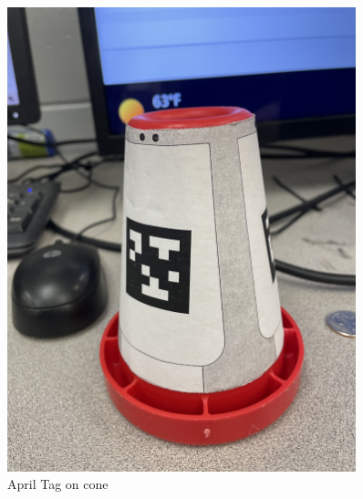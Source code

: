 \begin{figure}[htp]
\centering
\includegraphics[width=0.9\textwidth, angle=270]{Meetings/December/12-8-22/IMG_4530.jpg}
\caption{April Tag on cone}
\label{fig:082322}
\end{figure}




